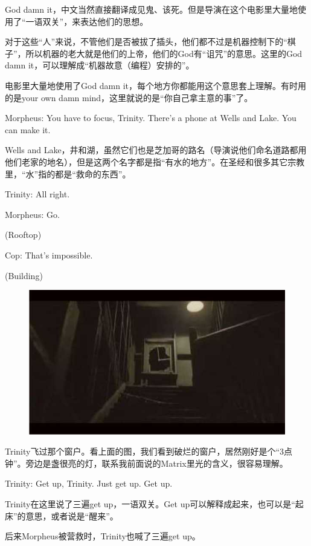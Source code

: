 \documentclass[UTF8]{ctexart}
\newenvironment{myquote}{\color{green} \setlength{\leftskip}{6em} \setlength{\rightskip}{4em} \setlength{\parindent}{-2em}}{\par}
\begin{document}
God damn it，中文当然直接翻译成见鬼、该死。但是导演在这个电影里大量地使用了“一语双关”，来表达他们的思想。

对于这些“人”来说，不管他们是否被拔了插头，他们都不过是机器控制下的“棋子”，所以机器的老大就是他们的上帝，他们的God有“诅咒”的意思。这里的God damn it，可以理解成“机器故意（编程）安排的”。

电影里大量地使用了God damn it，每个地方你都能用这个意思套上理解。有时用的是your own damn mind，这里就说的是“你自己拿主意的事”了。

\begin{myquote}
Morpheus: You have to focus, Trinity. There's a phone at Wells and Lake. You can make it.
\end{myquote}

Wells and Lake，井和湖，虽然它们也是芝加哥的路名（导演说他们命名道路都用他们老家的地名），但是这两个名字都是指“有水的地方”。在圣经和很多其它宗教里，“水”指的都是“救命的东西”。

\begin{myquote}
Trinity: All right.

Morpheus: Go.

(Rooftop)

Cop: That's impossible.

(Building)
\end{myquote}

\begin{figure}[htb]
\centering
\includegraphics[width=0.5\linewidth]{fig/read_Matrix-2}
\end{figure}

Trinity飞过那个窗户。看上面的图，我们看到破烂的窗户，居然刚好是个“3点钟”。旁边是盏很亮的灯，联系我前面说的Matrix里光的含义，很容易理解。

\begin{myquote}
Trinity: Get up, Trinity. Just get up. Get up.
\end{myquote}

Trinity在这里说了三遍get up，一语双关。Get up可以解释成起来，也可以是“起床”的意思，或者说是“醒来”。

后来Morpheus被营救时，Trinity也喊了三遍get up。
\end{document}
